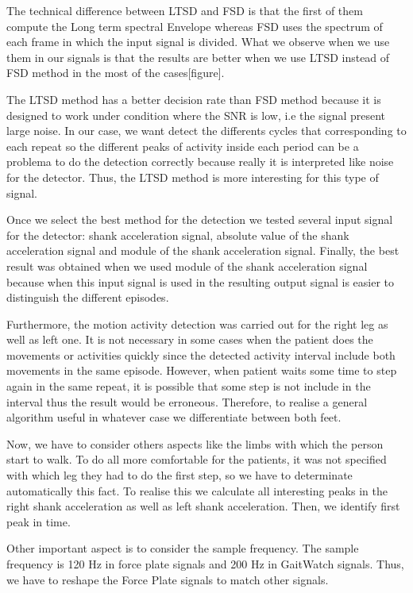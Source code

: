 The technical difference between LTSD and FSD is that the first of them compute the Long term spectral Envelope whereas FSD uses the spectrum of each frame  in which the input signal is divided\cite{A.Olivares2013}. What we observe when we use them in our signals is that the results are better when we use LTSD instead of FSD method  in the most of the cases[figure]. 

The LTSD method has a better decision rate than FSD method because it is designed to work under condition where the SNR is low, i.e the signal present large noise\cite{A.Olivares2013}. In our case, we want detect the differents cycles that corresponding to each repeat so the different peaks of activity inside each period can be a problema to do the detection correctly because really it is interpreted like noise for the detector. Thus, the LTSD method is more interesting for this type of signal.

Once we select the best method for the detection we tested several input signal for the detector: shank acceleration signal, absolute value of the shank acceleration signal and module of the shank acceleration signal. Finally, the best result was obtained when we used module of the shank acceleration signal because when this input signal is used in the resulting output signal is easier to distinguish the different episodes.

Furthermore, the motion activity detection was carried out for the right leg as well as left one. It is not necessary in some cases when the patient does the movements or activities quickly since the detected activity interval  include both movements in the same episode. However, when patient waits some time to step again in the same repeat, it is possible that some step is not  include in the interval thus the result would be erroneous. Therefore, to realise a general algorithm useful in whatever case we differentiate between both feet.


Now, we have to consider others aspects like the limbs with which the person start to walk. To do all more comfortable for the patients, it was not specified with which leg they had to do the first step, so we have to determinate automatically this fact. To realise this we calculate all interesting peaks in the right shank acceleration as well as left shank acceleration. Then, we identify first peak in time.

Other important aspect is to consider the sample frequency. The sample frequency is 120 Hz in force plate signals and 200 Hz in GaitWatch signals. Thus, we have to reshape the Force Plate signals to match other signals.

